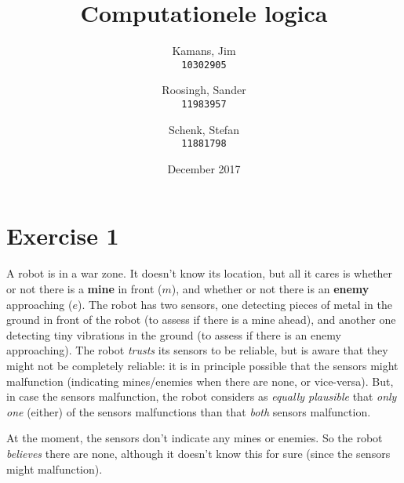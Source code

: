 \documentclass[leqno]{article}
\title{Computationele logica}
\author{
	Kamans, Jim\\
	\texttt{10302905}
	\and
	Roosingh, Sander\\
	\texttt{11983957}
	\and
	Schenk, Stefan\\
	\texttt{11881798}
}
\date{December 2017}
\begin{document}
\maketitle

\section*{Exercise 1}
A robot is in a war zone. 
It doesn't know its location, but all it cares is whether or not there is a 
\textbf{mine} in front ($m$), and whether or not there is an \textbf{enemy} 
approaching ($e$).
The robot has two sensors, one detecting pieces of metal in the ground in 
front of the robot (to assess if there is a mine ahead), and another one 
detecting tiny vibrations in the ground (to assess if there is an enemy 
approaching). 
The robot \textit{trusts} its sensors to be reliable, but is aware that they 
might not be completely reliable: it is in principle possible that the sensors 
might malfunction (indicating mines/enemies when there are none, or vice-versa). 
But, in case the sensors malfunction, the robot considers as \textit{equally 
plausible} that \textit{only one} (either) of the sensors malfunctions than 
that \textit{both} sensors malfunction.

At the moment, the sensors don't indicate any mines or enemies. 
So the robot \textit{believes} there are none, although it doesn't know this 
for sure (since the sensors might malfunction).
\end{document}
